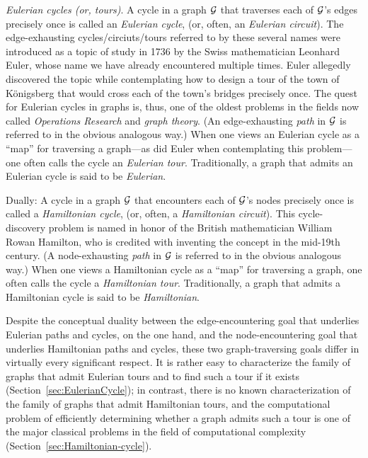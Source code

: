 \smallskip

{\it Eulerian cycles (or, tours)}.  A cycle in a graph $\mbox{$\cal G$}$ that
traverses each of $\mbox{$\cal G$}$'s edges precisely once is called an {\it
  Eulerian cycle}, 
(or, often, an {\it Eulerian circuit}).    The edge-exhausting
cycles/circiuts/tours referred to by these several names were
introduced as a topic of study in 1736 by the Swiss mathematician
 Leonhard Euler, whose name we have already
encountered multiple times.  Euler allegedly discovered the topic
while contemplating how to design a tour of the town of K\"{o}nigsberg
that would cross each of the town's bridges precisely once.  The quest
for Eulerian cycles in graphs is, thus, one of the oldest problems in
the fields now called {\it Operations Research} and {\it graph
  theory}.  (An edge-exhausting {\em path} in $\mbox{$\cal G$}$ is referred to in
the obvious analogous way.)  When one views an Eulerian cycle as a
``map'' for traversing a graph---as did Euler when contemplating this
problem---one often calls the cycle an {\it Eulerian tour}.
  Traditionally, a
graph that admits an Eulerian cycle is said to be {\it
  Eulerian}.  

\medskip

Dually: A cycle in a graph $\mbox{$\cal G$}$ that encounters each of $\mbox{$\cal G$}$'s nodes
precisely once is called a {\it Hamiltonian cycle},
  (or, often,
a {\it Hamiltonian circuit}). 
 This cycle-discovery problem is named in
honor of the British mathematician William Rowan Hamilton,
 who is credited with inventing the
concept in the mid-19th century.  (A node-exhausting {\em path} in
$\mbox{$\cal G$}$ is referred to in the obvious analogous way.)  When one views a
Hamiltonian cycle as a ``map'' for traversing a graph, one often calls
the cycle a {\it Hamiltonian tour}.  
 Traditionally, a graph that admits a
Hamiltonian cycle is said to be {\it
  Hamiltonian}.  

\medskip

Despite the conceptual duality between the edge-encountering goal that
underlies Eulerian paths and cycles, on the one hand, and the
node-encountering goal that underlies Hamiltonian paths and cycles,
these two graph-traversing goals differ in virtually every significant
respect.  It is rather easy to characterize the family of graphs that
admit Eulerian tours and to find such a tour if it exists
(Section~\ref{sec:EulerianCycle}); in contrast, there is no known
characterization of the family of graphs that admit Hamiltonian tours,
and the computational problem of efficiently determining whether a
graph admits such a tour is one of the major classical problems in the
field of computational complexity  (Section~\ref{sec:Hamiltonian-cycle}).

